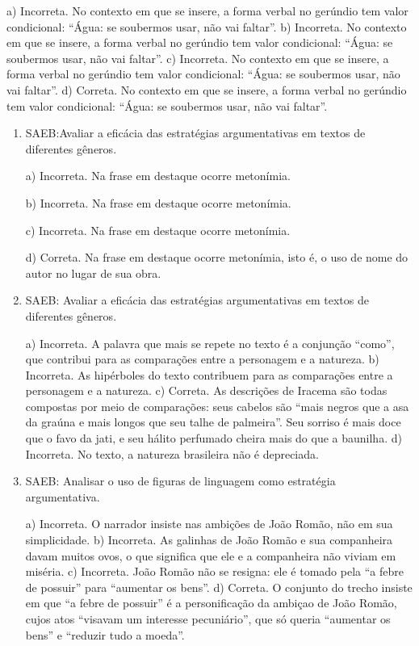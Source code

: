 \begin{enumerate}
a) Incorreta. No contexto em que se insere, a forma verbal no gerúndio tem valor condicional: 
``Água: se soubermos usar, não vai faltar''. 
b) Incorreta. No contexto em que se insere, a forma verbal no gerúndio tem valor condicional: 
``Água: se soubermos usar, não vai faltar''. 
c) Incorreta. No contexto em que se insere, a forma verbal no gerúndio tem valor condicional: 
``Água: se soubermos usar, não vai faltar''.
d) Correta. No contexto em que se insere, a forma verbal no gerúndio tem valor condicional: 
``Água: se soubermos usar, não vai faltar''.

\end{enumerate}


\begin{enumerate}

\item
SAEB:Avaliar a eficácia das estratégias argumentativas em textos de
diferentes gêneros.

a) Incorreta. Na frase em destaque ocorre metonímia.

b) Incorreta. Na frase em destaque ocorre metonímia.

c) Incorreta. Na frase em destaque ocorre metonímia.

d) Correta. Na frase em destaque ocorre metonímia, isto é, o uso de nome do autor 
no lugar de sua obra. 

\item
SAEB: Avaliar a eficácia das estratégias argumentativas em textos de
diferentes gêneros.

a) Incorreta. A palavra que mais se repete no texto é a conjunção ``como'', que contribui
para as comparações entre a personagem e a natureza.
b) Incorreta. As hipérboles do texto contribuem
para as comparações entre a personagem e a natureza.
c) Correta. As descrições de Iracema são todas compostas por meio de comparações:
seus cabelos são ``mais negros que a asa da graúna e mais longos
que seu talhe de palmeira''. Seu sorriso é mais doce que o favo da jati,
e seu hálito perfumado cheira mais do que a baunilha. 
d) Incorreta. No texto, a natureza brasileira não é depreciada.

\item
SAEB: Analisar o uso de figuras de linguagem como estratégia argumentativa.

a) Incorreta. O narrador insiste nas ambições de João Romão, não em sua simplicidade.
b) Incorreta. As galinhas de João Romão e sua companheira davam muitos ovos, o que significa 
que ele e a companheira não viviam em miséria.
c) Incorreta. João Romão não se resigna: ele é tomado pela ``a febre de possuir'' para ``aumentar 
os bens''.
d) Correta. O conjunto do trecho insiste em que ``a febre de possuir'' é a personificação da 
ambiçao de João Romão, cujos atos ``visavam um interesse pecuniário'', que só queria ``aumentar 
os bens'' e ``reduzir tudo a moeda''.

\end{enumerate}

